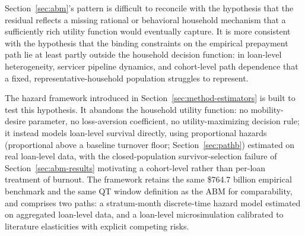 \documentclass[12pt]{article}
\begin{document}
Section~\ref{sec:abm}'s pattern is difficult to reconcile with the hypothesis that the residual reflects a missing rational or behavioral household mechanism that a sufficiently rich utility function would eventually capture. It is more consistent with the hypothesis that the binding constraints on the empirical prepayment path lie at least partly outside the household decision function: in loan-level heterogeneity, servicer pipeline dynamics, and cohort-level path dependence that a fixed, representative-household population struggles to represent.

The hazard framework introduced in Section~\ref{sec:method-estimators} is built to test this hypothesis. It abandons the household utility function: no mobility-desire parameter, no loss-aversion coefficient, no utility-maximizing decision rule; it instead models loan-level survival directly, using proportional hazards (proportional above a baseline turnover floor; Section~\ref{sec:pathb}) estimated on real loan-level data, with the closed-population survivor-selection failure of Section~\ref{sec:abm-results} motivating a cohort-level rather than per-loan treatment of burnout. The framework retains the same \$764.7 billion empirical benchmark and the same QT window definition as the ABM for comparability, and comprises two paths: a stratum-month discrete-time hazard model estimated on aggregated loan-level data, and a loan-level microsimulation calibrated to literature elasticities with explicit competing risks.
\end{document}
